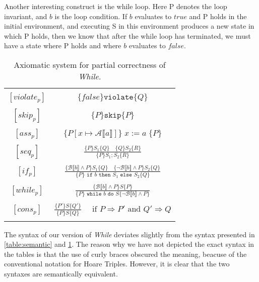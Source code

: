 Another interesting construct is the while loop.
Here P denotes the loop invariant, and $b$ is the loop condition.
If $b$ evaluates to $true$ and P holds in the initial environment, and executing S in this environment produces a new state in which P holds, then we know that after the while loop has terminated, we must have a state where P holds and where $b$ evaluates to $false$.

\begin{table}[h!]
\centering
\begin{tabular}{|c c|} 
 \hline
	& \\
 $[violate_p ]$ & $\{ false \} \texttt{violate} \{ Q \}$ \\ 
	& \\
 $[skip_p ]$ & $\{ P \} \texttt{skip} \{ P \}$ \\ 
	& \\
 $[ass_p ]$ & $\{ P[x \mapsto \mathcal{A} \llbracket a \rrbracket ] \} \; x := a \; \{ P \}$ \\ 
	& \\
 $[seq_p ]$ & 
		$\frac{\{ P \} S_1 \{Q \} \quad \{ Q\} S_2 \{ R \}}{\{ P \} S_1;S_2 \{ R \}}$ \\ 
	& \\
 $[if_p ]$ & 
		$\frac{ \{\mathcal{B} \llbracket b \rrbracket \land P \} S_1 \{ Q \} \quad 
           \{ \neg \mathcal{B} \llbracket b \rrbracket \land P\} S_2 \{ Q \} }
          {\{P\} \texttt{ if } b \texttt{ then } S_1 \texttt{ else } S_2 \{Q\}}$ \\
	& \\
 $[while_p ]$ & 
		$\frac{ \{\mathcal{B} \llbracket b \rrbracket \land P \} S \{ P \}}
          {\{P\} \texttt{ while } b \texttt{ do } S 
           \{\neg \mathcal{B} \llbracket b \rrbracket \land P\}}$ \\
	& \\
 $[cons_p ]$ & 
		$\frac{ \{P'\} S \{Q'\}}{\{P\} S \{Q\}} \quad 
     \text{ if } P \Rightarrow P' \text{ and } Q' \Rightarrow Q $ \\
	& \\
 \hline
\end{tabular}
\caption{Axiomatic system for partial correctness of \textit{While}.}
\label{table:axiomatic}
\end{table}

The syntax of our version of \textit{While} deviates slightly from the syntax presented in \cref{table:semantic} and \cref{table:axiomatic}.
The reason why we have not depicted the exact syntax in the tables is that the use of curly braces obscured the meaning, beacuse of the conventional notation for Hoare Triples.
However, it is clear that the two syntaxes are semantically equivalent. 

